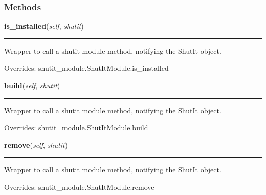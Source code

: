 
  \subsubsection{Methods}

    \vspace{0.5ex}

\hspace{.8\funcindent}\begin{boxedminipage}{\funcwidth}

    \raggedright \textbf{is\_installed}(\textit{self}, \textit{shutit})

    \vspace{-1.5ex}

    \rule{\textwidth}{0.5\fboxrule}
\setlength{\parskip}{2ex}
    Wrapper to call a shutit module method, notifying the ShutIt object.

\setlength{\parskip}{1ex}
      Overrides: shutit\_module.ShutItModule.is\_installed

    \end{boxedminipage}

    \vspace{0.5ex}

\hspace{.8\funcindent}\begin{boxedminipage}{\funcwidth}

    \raggedright \textbf{build}(\textit{self}, \textit{shutit})

    \vspace{-1.5ex}

    \rule{\textwidth}{0.5\fboxrule}
\setlength{\parskip}{2ex}
    Wrapper to call a shutit module method, notifying the ShutIt object.

\setlength{\parskip}{1ex}
      Overrides: shutit\_module.ShutItModule.build

    \end{boxedminipage}

    \vspace{0.5ex}

\hspace{.8\funcindent}\begin{boxedminipage}{\funcwidth}

    \raggedright \textbf{remove}(\textit{self}, \textit{shutit})

    \vspace{-1.5ex}

    \rule{\textwidth}{0.5\fboxrule}
\setlength{\parskip}{2ex}
    Wrapper to call a shutit module method, notifying the ShutIt object.

\setlength{\parskip}{1ex}
      Overrides: shutit\_module.ShutItModule.remove

    \end{boxedminipage}

